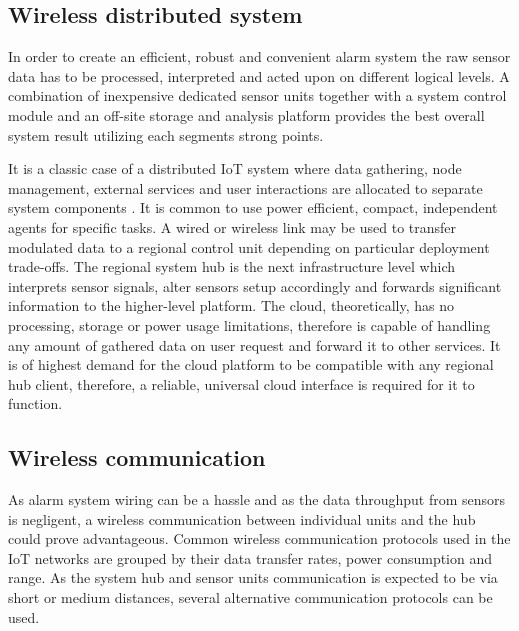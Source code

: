 \documentclass[conference]{IEEEtran}
\begin{document}
\subsection{Wireless distributed system}
In order to create an efficient, robust and convenient alarm system the raw sensor data has to be processed, interpreted and acted upon on different logical levels. A combination of inexpensive dedicated sensor units together with a system control module and an off-site storage and analysis platform provides the best overall system result utilizing each segments strong points. 

It is a classic case of a distributed IoT system where data gathering, node management, external services and user interactions are allocated to separate system components \cite{iot_framework}. It is common to use power efficient, compact, independent agents for specific tasks. A wired or wireless link may be used to transfer modulated data to a regional control unit depending on particular deployment trade-offs. The regional system hub is the next infrastructure level which interprets sensor signals, alter sensors setup accordingly and forwards significant information to the higher-level platform. The cloud, theoretically, has no processing, storage or power usage limitations, therefore is capable of handling any amount of gathered data on user request and forward it to other services. It is of highest demand for the cloud platform to be compatible with any regional hub client, therefore, a reliable, universal cloud interface is required for it to function. 

\subsection{Wireless communication}
As alarm system wiring can be a hassle and as the data throughput from sensors is negligent, a wireless communication between individual units and the hub could prove advantageous. Common wireless communication protocols used in the IoT networks are grouped by their data transfer rates, power consumption and range. As the system hub and sensor units communication is expected to be via short or medium distances, several alternative communication protocols can be used. 
\end{document}
